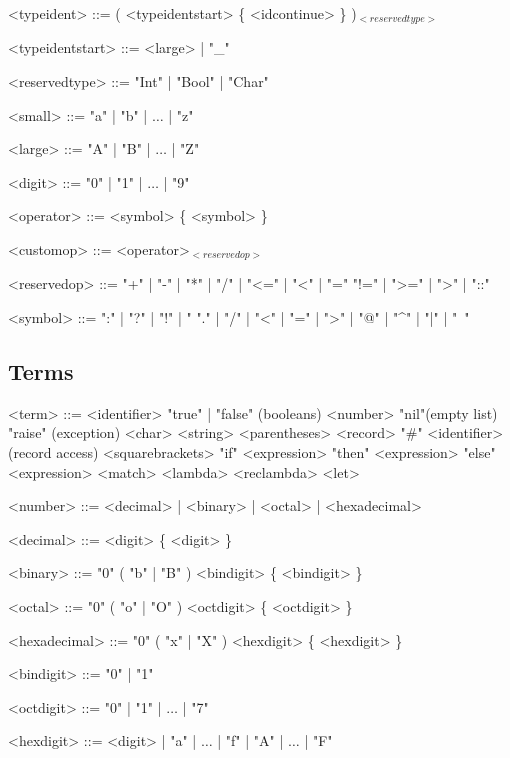 \documentclass{article}
\begin{document}
\begin{grammar}
  <typeident> ::= ( <typeidentstart> \{ <idcontinue> \} )$_{<reservedtype>}$

  <typeidentstart> ::= <large> | "_"

  <reservedtype> ::= "Int" | "Bool" | "Char"
\end{grammar}

\begin{grammar}
  <small> ::= "a" | "b" | $\ldots$ | "z"

  <large> ::= "A" | "B" | $\ldots$ | "Z"

  <digit> ::= "0" | "1" | $\ldots$ | "9"
\end{grammar}

\begin{grammar}
  <operator> ::= <symbol> \{ <symbol> \}

  <customop> ::= <operator>$_{<reservedop>}$

  <reservedop> ::= "+" | "-" | "*" | "/" | "<=" | "<" | "="
  \alt "!=" | ">=" | ">" | "::"

  <symbol> ::= ":" | "?" | "!" | "%
  \alt "." | "/" | "<" | "=" | ">" | "@" | "^" | "|" | "~"
\end{grammar}

\newpage

\subsection{Terms}

\begin{grammar}
  <term> ::= <identifier>
  \alt "true" | "false" \hfill (booleans)
  \alt <number>
  \alt "nil"\hfill (empty list)
  \alt "raise" \hfill (exception)
  \alt <char>
  \alt <string>
  \alt <parentheses>
  \alt <record>
  \alt "#" <identifier> \hfill (record access)
  \alt <squarebrackets>
  \alt "if" \textvisiblespace <expression> "then" \textvisiblespace <expression> "else" \textvisiblespace <expression>
  \alt <match>
  \alt <lambda>
  \alt <reclambda>
  \alt <let>
\end{grammar}

\begin{grammar}
  <number> ::= <decimal> | <binary> | <octal> | <hexadecimal>

  <decimal> ::= <digit> \{ <digit> \}

  <binary> ::= "0" ( "b" | "B" ) <bindigit> \{ <bindigit> \}

  <octal> ::= "0" ( "o" | "O" ) <octdigit> \{ <octdigit> \}

  <hexadecimal> ::= "0" ( "x" | "X" ) <hexdigit> \{ <hexdigit> \}

  <bindigit> ::= "0" | "1"

  <octdigit> ::= "0" | "1" | $\ldots$ | "7"

  <hexdigit> ::= <digit> | "a" | $\ldots$ | "f" | "A" | $\ldots$ | "F"
\end{grammar}
\end{document}
